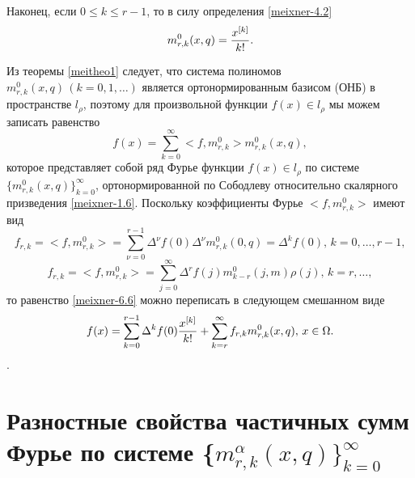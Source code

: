 Наконец, если $0\le k\le r-1$, то в силу определения \eqref{meixner-4.2}
\begin{equation}\label{meixner-6.5}
m_{r,k}^{0}(x,q)={x^{[k]}\over k!}.
\end{equation}


Из теоремы \eqref{meitheo1} следует, что система полиномов $m_{r,k}^{0}(x,q)\, (k=0,1,\ldots)$
является ортонормированным базисом (ОНБ) в пространстве $l_\rho$, поэтому для произвольной функции $f(x)\in l_\rho$ мы можем записать равенство
  \begin{equation}\label{meixner-6.6}
 f(x)= \sum_{k=0}^\infty<f,m_{r,k}^{0}> m_{r,k}^{0}(x,q),
  \end{equation}
которое представляет собой ряд Фурье функции $f(x)\in l_\rho$ по системе
$\{m_{r,k}^{0}(x,q)\}_{k=0}^\infty$, ортонормированной по Сободлеву относительно скалярного призведения \eqref{meixner-1.6}. Поскольку коэффициенты Фурье $<f,m_{r,k}^{0}>$ имеют  вид
\begin{equation}\label{meixner-6.7}
f_{r,k}=<f,m_{r,k}^{0}> =\sum_{\nu=0}^{r-1}\Delta^\nu f(0)\Delta^\nu m_{r,k}^{0}(0,q)=\Delta^kf(0),\, k=0,\ldots, r-1,
 \end{equation}
 \begin{equation}\label{meixner-6.8}
f_{r,k}= <f,m_{r,k}^{0}>=\sum_{j=0}^\infty\Delta^rf(j)m_{k-r}^{0}(j,m)\rho(j),\, k=r,\ldots,
 \end{equation}
то равенство \eqref{meixner-6.6} можно переписать в следующем  смешанном виде
  \begin{equation}\label{meixner-6.9}
 f(x)= \sum_{k=0}^{r-1}\Delta^kf(0){x^{[k]}\over k!} +\sum_{k=r}^\infty f_{r,k} m_{r,k}^{0}(x,q),\, x\in \Omega.
  \end{equation}.


\section{Разностные свойства частичных сумм Фурье по системе
\{$ m_{r,k}^{\alpha}(x,q)\}_{k=0}^\infty $}


